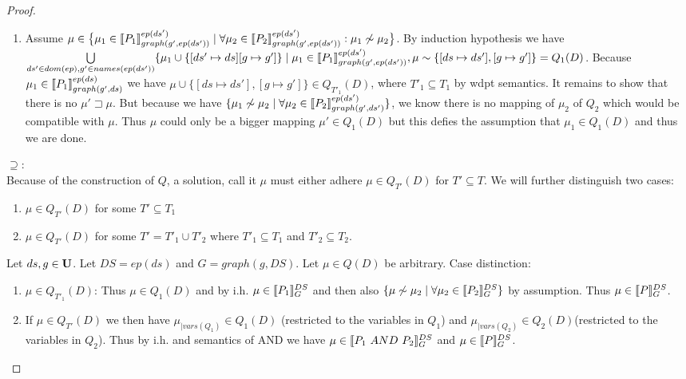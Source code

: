 \begin{proof}
\begin{enumerate}
\begin{enumerate}
	\item Assume $\mu \in \big\{ \mu_1 \in  \llbracket P_1 \rrbracket^{ep(ds')}_{graph(g',ep(ds'))} \mid 
			\forall \mu_2 \in \llbracket P_2 \rrbracket^{ep(ds')}_{graph(g',ep(ds'))}:
		\mu_1 \not\sim \mu_2 \big\}$. By induction hypothesis we have 
		$\bigcup\limits_{ds' \in dom(ep), g' \in names(ep(ds'))} \{ \mu_1 \cup \{[ds' \mapsto
			ds] [g \mapsto g'] \} \mid \mu_1 \in
			\llbracket P_1\rrbracket^{ep(ds')}_{graph(g',ep(ds'))}, \mu \sim
			\{[ds \mapsto ds'],[g\mapsto g']\}  = Q_1(D)$.
			Because $\mu_1 \in \llbracket P_1
			\rrbracket^{ep(ds)}_{graph(g',ds)}$ 
			we have $\mu\cup \{[ds \mapsto ds'],[g \mapsto g'] \}\in Q_{T'_1}(D)$, where
			$T'_1 \subseteq T_1$ by wdpt semantics.
			It remains to show that there
			is no $\mu' \sqsupset \mu$. But because we have $\{\mu_1 \not\sim \mu_2 \mid
			\forall \mu_2 \in \llbracket P_2 \rrbracket^{ep(ds')}_{graph(g',ds')} \}$, 
			we know there is no mapping
			of $\mu_2$ of $Q_2$ which would be compatible with $\mu$. Thus $\mu$ could
			only be a bigger mapping $\mu' \in Q_1(D)$ but this defies the
			assumption that $\mu_1 \in Q_1(D)$ and thus we are done.
	\end{enumerate}

	\bigskip\noindent$\supseteq:$\\
	Because of the construction of $Q$, a solution, call it $\mu$ must either
	adhere $\mu \in Q_{T'}(D)$ for $T' \subseteq T$. We will further distinguish two
	cases:
	\begin{enumerate}
		\item $\mu \in Q_{T'}(D)$ for some $T' \subseteq T_1$ 
		\item  $\mu \in	Q_{T'}(D)$ for some $T' = T'_1 \cup T'_2$ where $T'_1 \subseteq T_1$ and
	$T'_2 \subseteq T_2$.
	\end{enumerate}

	\bigskip\noindent
	Let $ds,g \in \mathbf{U}$. Let $DS= ep(ds)$ and $G = graph(g,DS)$. 
	Let $\mu \in Q(D)$ be arbitrary.
	Case distinction:
	\begin{enumerate}
		\item $\mu \in Q_{T'_1}(D)$: Thus $\mu \in Q_1(D)$ and by i.h. $\mu \in \llbracket P_1 \rrbracket^{DS}_{G}$ 
			and then also $\{\mu \not\sim \mu_2 \mid \forall \mu_2 \in
			\llbracket P_2 \rrbracket^{DS}_{G} \}$ by assumption. Thus $\mu \in \llbracket P
			\rrbracket_{G}^{DS}$.
		\item If $\mu \in Q_{T'}(D)$ we then have $\mu_{|vars(Q_1)} \in Q_1(D)$  (restricted to
			the variables in $Q_1$) and $\mu_{|vars(Q_2)} \in Q_2(D)$(restricted to the variables
			in $Q_2$). Thus by i.h. and semantics of AND we have $\mu \in \llbracket P_1 \ AND \ P_2 \rrbracket^{DS}_{G}$
			and $\mu \in \llbracket P \rrbracket^{DS}_{G}$.
	\end{enumerate}


\end{enumerate}
\end{proof}
